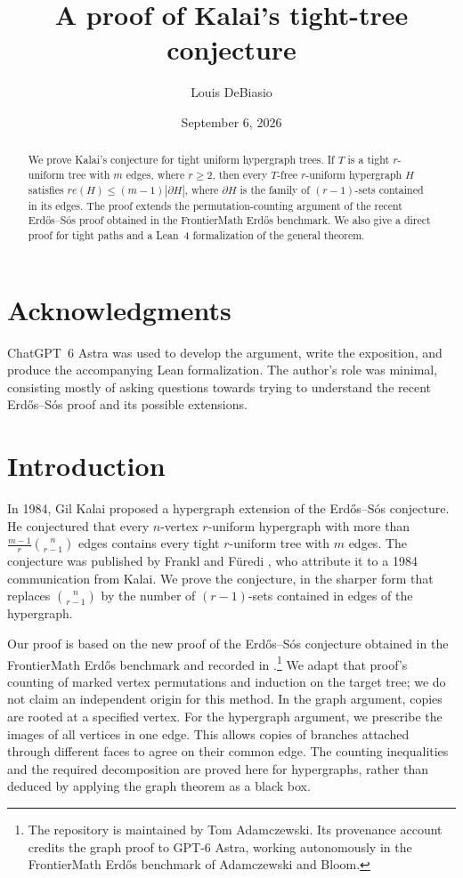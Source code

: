 \documentclass[11pt]{article}
\title{A proof of Kalai's tight-tree conjecture}
\author{Louis DeBiasio}
\date{September 6, 2026}
\numberwithin{equation}{section}
\theoremstyle{definition}
\begin{document}
\maketitle

\begin{abstract}
We prove Kalai's conjecture for tight uniform hypergraph trees.
If $T$ is a tight $r$-uniform tree with $m$ edges, where $r\geq2$,
then every $T$-free $r$-uniform hypergraph $H$ satisfies
$r e(H)\leq(m-1)|\partial H|$, where $\partial H$ is the family
of $(r-1)$-sets contained in its edges.  The proof extends the
permutation-counting argument of the recent Erd\H{o}s--S\'os proof
obtained in the FrontierMath Erd\H{o}s benchmark.  We also give a direct proof for
tight paths and a Lean~4 formalization of the general theorem.
\end{abstract}

\section*{Acknowledgments}
ChatGPT~6 Astra was used to develop the argument, write the exposition,
and produce the accompanying Lean formalization.  The author's role
was minimal, consisting mostly of asking questions towards trying to understand
the recent Erd\H{o}s--S\'os proof and its possible extensions.

\section{Introduction}
\label{sec:introduction}

In 1984, Gil Kalai \cite{Kalai1984} proposed a hypergraph extension
of the Erd\H{o}s--S\'os conjecture.  He conjectured that every
$n$-vertex $r$-uniform hypergraph with more than
$\frac{m-1}{r}\binom n{r-1}$ edges contains every tight $r$-uniform
tree with $m$ edges.  The conjecture was published by Frankl and
F\"uredi \cite[Conjecture~3.6]{FF1987}, who attribute it to a 1984
communication from Kalai.  We prove the conjecture, in the sharper
form that replaces $\binom n{r-1}$ by the number of $(r-1)$-sets
contained in edges of the hypergraph.

Our proof is based on the new proof of the Erd\H{o}s--S\'os conjecture
obtained in the FrontierMath Erd\H{o}s benchmark and recorded in
\cite{Erdos548Repository}.\footnote{The repository is maintained by
Tom Adamczewski.  Its provenance account credits the graph proof to
GPT-6 Astra, working autonomously in the FrontierMath Erd\H{o}s
benchmark of Adamczewski and Bloom.}
We adapt that proof's counting of marked vertex permutations and
induction on the target tree; we do not claim an independent origin
for this method.  In the graph argument, copies are rooted at a
specified vertex.  For the hypergraph argument, we prescribe the
images of all vertices in one edge.  This allows copies of branches
attached through different faces to agree on their common edge.
The counting inequalities and the required decomposition are proved
here for hypergraphs, rather than deduced by applying the graph
theorem as a black box.
\end{document}
